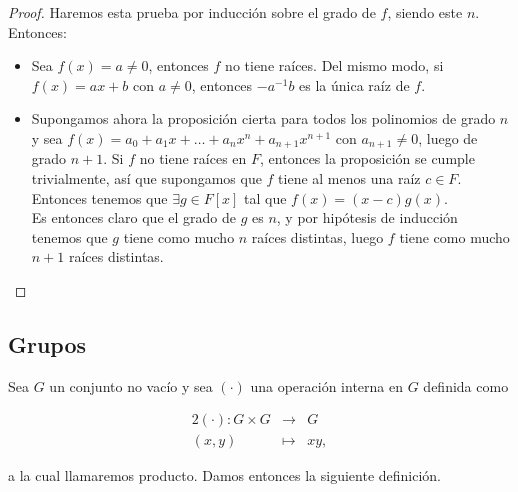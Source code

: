 \begin{proof}
	Haremos esta prueba por inducción  sobre el grado de $f$, siendo este $n$. Entonces:
	
	\begin{itemize}
		\item Sea $f(x) = a \neq 0$, entonces $f$ no tiene raíces. Del mismo modo, si $f(x) = ax + b$ con $a \neq 0$, entonces $-a^{-1}b$ es la única raíz de $f$.
		
		\item Supongamos ahora la proposición cierta para todos los polinomios de grado $n$ y sea $f(x) = a_0 + a_1x + \dotso + a_nx^n + a_{n+1}x^{n+1}$ con $a_{n+1} \neq 0$, luego de grado $n+1$. Si $f$ no tiene raíces en $F$, entonces la proposición se cumple trivialmente, así que supongamos que $f$ tiene al menos una raíz $c \in F$. Entonces tenemos que $\exists g \in F[x]$ tal que $f(x) = (x - c)g(x)$.\\
		
		Es entonces claro que el grado de $g$ es $n$, y por hipótesis de inducción tenemos que $g$ tiene como mucho $n$ raíces distintas, luego $f$ tiene como mucho $n+1$ raíces distintas.
	\end{itemize}
\end{proof}

\subsection{Grupos}

Sea $G$ un conjunto no vacío y sea $(\cdot)$ una operación interna en $G$ definida como

\begin{alignat*}{2}
	(\cdot): G \times G & \to & G \\
	(x, y) & \mapsto & xy,
\end{alignat*}

a la cual llamaremos producto. Damos entonces la siguiente definición.

